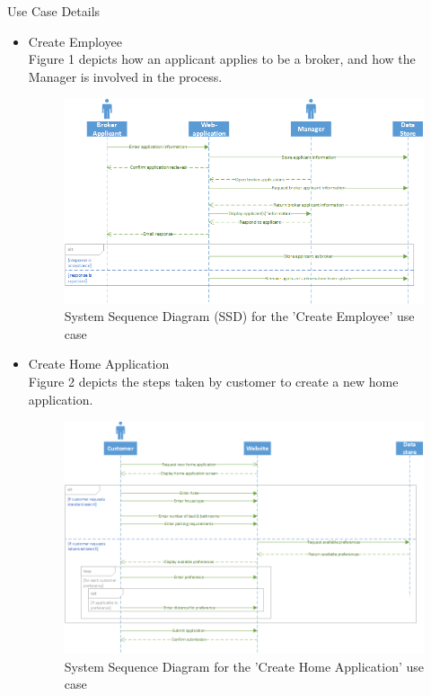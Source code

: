 \documentclass[12pt]{article}
\begin{document}
\huge Use Case Details

\begin{itemize}

\item \large Create Employee\\
Figure 1 depicts how an applicant applies to be a broker, and how the Manager is involved in the process.

\begin{figure}[h]
\centering
\includegraphics[scale=0.8]{SSDCreateEmployeeV1}
\caption{System Sequence Diagram (SSD) for the 'Create Employee' use case}
\end{figure}


\item \large Create Home Application\\
Figure 2 depicts the steps taken by customer to create a new home application.

\begin{figure}[h]
\centering
\includegraphics[scale=0.7]{SSDCreateHomeApplication}
\caption{System Sequence Diagram for the 'Create Home Application' use case}
\end{figure}


\end{itemize}
\end{document}

